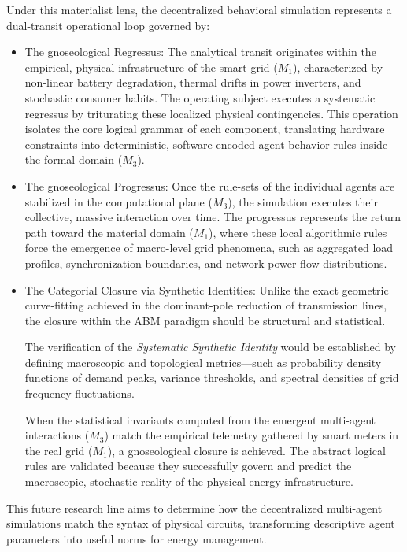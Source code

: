 \documentclass[energies,accept,oneauthor,pdftex]{Definitions/mdpi}
\begin{document}
Under this materialist lens, the decentralized behavioral simulation represents a dual-transit operational loop governed by:
\begin{itemize}
\item {The gnoseological Regressus:} The analytical transit originates within the empirical, physical infrastructure of the smart grid ($M_1$), characterized by non-linear battery degradation, thermal drifts in power inverters, and stochastic consumer habits. The operating subject executes a systematic regressus by triturating these localized physical contingencies. This operation isolates the core logical grammar of each component, translating hardware constraints into deterministic, software-encoded agent behavior rules inside the formal domain ($M_3$).

\item {The gnoseological Progressus:} Once the rule-sets of the individual agents are stabilized in the computational plane ($M_3$), the simulation executes their collective, massive interaction over time. The progressus represents the return path toward the material domain ($M_1$), where these local algorithmic rules force the emergence of macro-level grid phenomena, such as aggregated load profiles, synchronization boundaries, and network power flow distributions.

\item {The Categorial Closure via Synthetic Identities:} Unlike the exact geometric curve-fitting achieved in the dominant-pole reduction of transmission lines, the closure within the ABM paradigm should be structural and statistical.

The verification of the \textit{Systematic Synthetic Identity} would be established by defining macroscopic and topological metrics---such as probability density functions of demand peaks, variance thresholds, and spectral densities of grid frequency fluctuations.

When the statistical invariants computed from the emergent multi-agent interactions ($M_3$) match the empirical telemetry gathered by smart meters in the real grid ($M_1$), a gnoseological closure is achieved. The abstract logical rules are validated because they successfully govern and predict the macroscopic, stochastic reality of the physical energy infrastructure.
\end{itemize}

This future research line aims to determine how the decentralized multi-agent simulations match the syntax of physical circuits, transforming descriptive agent parameters into useful norms for energy management.
\end{document}
